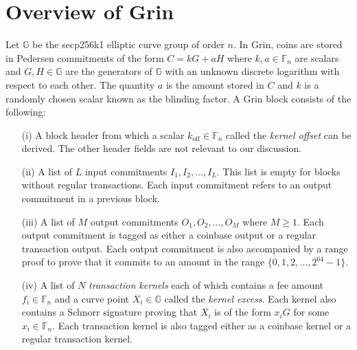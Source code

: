 \section{Overview of Grin}
\label{scn:GrinOverview}

Let $\mathbb{G}$ be the secp256k1 elliptic curve group of order $n$.
In Grin, coins are stored in Pedersen commitments of the form $C = kG + aH$ where $k, a \in \mathbb{F}_n$ are scalars and $G, H \in \mathbb{G}$ are the generators of $\mathbb{G}$ with an unknown discrete logarithm with respect to each other.
The quantity $a$ is the amount stored in $C$ and $k$ is a randomly chosen scalar known as the blinding factor. 
A Grin block consists of the following:
\begin{enumerate}
  \item[(i)] A block header from which a scalar $k_{\text{off}} \in \mathbb{F}_n$ called the \textit{kernel offset} can be derived. The other header fields are not relevant to our discussion.
  \item[(ii)] A list of $L$ input commitments $I_1, I_2,\ldots,I_L$. This list is empty for blocks without regular transactions. Each input commitment refers to an output commitment in a previous block.
  \item[(iii)] A list of $M$ output commitments $O_1, O_2,\ldots,O_M$ where $M \ge 1$. Each output commitment is tagged as either a coinbase output or a regular transaction output. Each output commitment is also accompanied by a range proof to prove that it commits to an amount in the range $\{0,1,2, \dots,2^{64}-1\}$.  
  \item[(iv)] A list of $N$ \textit{transaction kernels} each of which contains a fee amount $f_i \in \mathbb{F}_n$ and a curve point $X_i \in \mathbb{G}$ called the \textit{kernel excess}. Each kernel also contains a Schnorr signature proving that $X_i$ is of the form $x_iG$ for some $x_i \in \mathbb{F}_n$. Each transaction kernel is also tagged either as a coinbase kernel or a regular transaction kernel.
\end{enumerate}
